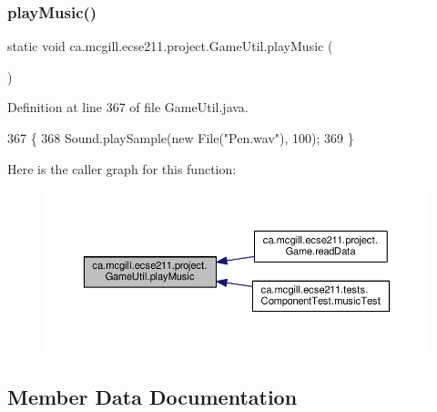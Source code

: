 \subsubsection{\texorpdfstring{play\+Music()}{playMusic()}}
{\footnotesize\ttfamily static void ca.\+mcgill.\+ecse211.\+project.\+Game\+Util.\+play\+Music (\begin{DoxyParamCaption}{ }\end{DoxyParamCaption})\hspace{0.3cm}{\ttfamily [static]}}



Definition at line 367 of file Game\+Util.\+java.


\begin{DoxyCode}
367                                  \{
368     Sound.playSample(\textcolor{keyword}{new} File(\textcolor{stringliteral}{"Pen.wav"}), 100);
369   \}
\end{DoxyCode}
Here is the caller graph for this function\+:
\nopagebreak
\begin{figure}[H]
\begin{center}
\leavevmode
\includegraphics[width=350pt]{classca_1_1mcgill_1_1ecse211_1_1project_1_1_game_util_a38f0e4fdf048d1c265a4b5fc712588f3_icgraph}
\end{center}
\end{figure}


\subsection{Member Data Documentation}
\mbox{\label{classca_1_1mcgill_1_1ecse211_1_1project_1_1_game_util_afc9ecf0a8a18c0abea79086801d8425a}} 
